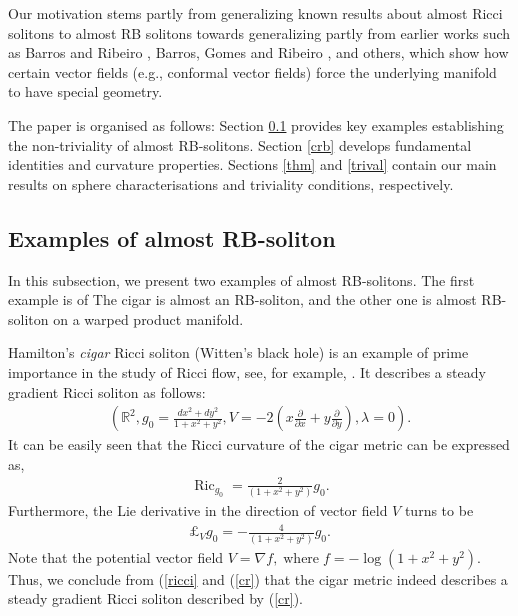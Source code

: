 \documentclass[a4paper, twoside, 10pt]{article}
\numberwithin{equation}{section}
\theoremstyle{definition}
\begin{document}
Our motivation stems partly from generalizing known results about almost Ricci solitons to almost RB solitons towards generalizing partly from earlier works such as Barros and Ribeiro \cite{barros2012some}, Barros, Gomes and Ribeiro \cite{barros2013note}, and others, which show how certain vector fields (e.g., conformal vector fields) force the underlying manifold to have special geometry.


The paper is organised as follows: Section \ref{eg} provides key examples establishing the non-triviality of almost RB-solitons. Section \ref{crb} develops fundamental identities and curvature properties. Sections \ref{thm} and \ref{trival} contain our main results on sphere characterisations and triviality conditions, respectively.




\subsection{Examples of almost RB-soliton}\label{eg}
In this subsection, we present two examples of almost RB-solitons. The first example is of
The cigar is almost an RB-soliton, and the other one is almost
 RB-soliton on a warped product manifold.


Hamilton's {\it cigar} Ricci soliton (Witten's black hole) is an example of prime 
importance in the study of Ricci flow, 
see, for example,  \cite[\bf p.~10]{PT}.
 It describes a steady gradient Ricci soliton as follows:
\begin{eqnarray}\label{css}
 \left({\mathbb{R}^2}, g_0 = \frac{dx^2+dy^2}{1+x^2+y^2}, V = - 2\left(x\frac{\partial}{\partial x}+y\frac{\partial}{\partial y} \right), \lambda=0 \right).
\end{eqnarray}
 It can be easily seen that the Ricci curvature of the cigar metric can be expressed as,
 \begin{eqnarray}\label{ricci}
\operatorname{Ric}_{g_0}=\frac{2}{\left(1+x^2+y^2\right)}g_0.
\end{eqnarray}
Furthermore, the Lie derivative in the direction of 
vector field $V$ turns to be
\begin{eqnarray}\label{cr}
\pounds_V g_0=-\frac{4}{\left(1+x^2+y^2\right)}g_0.
\end{eqnarray}
Note that the potential vector field 
$V = \nabla f, \;\text{where}\; f = - \log\left(1+x^2+y^2\right).$  
Thus, we conclude from (\ref{ricci} and (\ref{cr}) that the cigar metric indeed describes a steady gradient Ricci soliton
 described by (\ref{cr}).
\end{document}
